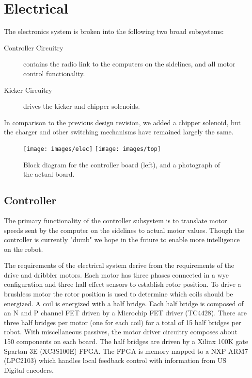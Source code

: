 \section{Electrical}
The electronics system is broken into the following two broad subsystems:
\begin{description}
 \item[Controller Circuitry] contains the radio link to the computers on the sidelines, and all motor control functionality.
 \item[Kicker Circuitry]  drives the kicker and chipper solenoids.
\end{description}
In comparison to the previous design revision, we added a chipper solenoid, but the charger and other switching mechanisms have remained largely the same. 

\begin{figure}
       \centering
       \vspace {0 cm}
       \texttt{[image: images/elec]}
       \texttt{[image: images/top]}
       \caption{Block diagram for the controller board (left), and a photograph of the actual board.}
\end{figure}

\subsection{Controller}
The primary functionality of the controller subsystem is to translate motor speeds sent by the computer on the sidelines to actual motor values. Though the controller is currently "dumb" we hope in the future to enable more intelligence on the robot.

The requirements of the electrical system derive from the requirements of the drive and dribbler motors. Each motor has three phases connected in a wye configuration and three hall effect sensors to establish rotor position. To drive a brushless motor the rotor position is used to determine which coils should be energized. A coil is energized with a half bridge. Each half bridge is composed of an N and P channel FET driven by a Microchip FET driver (TC4428). There are three half bridges per motor (one for each coil) for a total of 15 half bridges per robot. With miscellaneous passives, the motor driver circuitry composes about 150 components on each board. The half bridges are driven by a Xilinx 100K gate Spartan 3E (XC3S100E) FPGA. The FPGA is memory mapped to a NXP ARM7 (LPC2103) which handles local feedback control with information from US Digital encoders.

